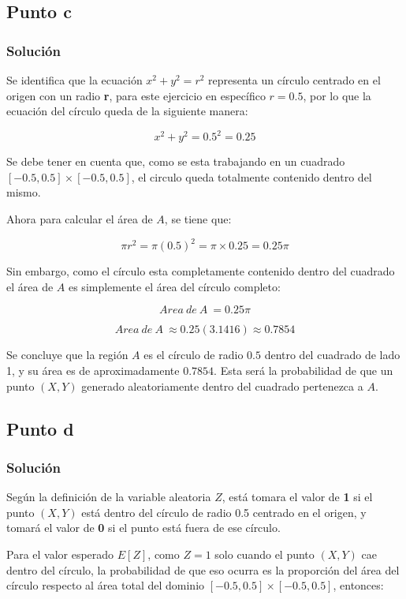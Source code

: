 \documentclass[12pt]{article}
\begin{document}
\subsection{Punto c}
\subsubsection{Solución}

Se identifica que la ecuación $x^2+y^2=r^2$ representa un círculo centrado en el origen con un radio \textbf{r}, para este ejercicio en específico $r=0.5$, por lo que la ecuación del círculo queda de la siguiente manera:

\[x^2+y^2=0.5^2=0.25\]

Se debe tener en cuenta que, como se esta trabajando en un cuadrado $[-0.5,0.5] \times [-0.5,0.5]$, el circulo queda totalmente contenido dentro del mismo.


Ahora para calcular el área de $A$, se tiene que:

\[\pi r^2=\pi(0.5)^2=\pi\times0.25=0.25\pi\]

Sin embargo, como el círculo esta completamente contenido dentro del cuadrado el área de $A$ es simplemente el área del círculo completo:

\[Area\ de\ A\ =0.25\pi\]

\[Area\ de\ A\ \approx0.25(3.1416)\approx0.7854\]

Se concluye que la región $A$ es el círculo de radio $0.5$ dentro del cuadrado de lado 1, y su área es de aproximadamente $0.7854$. Esta será la probabilidad de que un punto \textit{$(X,Y)$} generado aleatoriamente dentro del cuadrado pertenezca a $A$.


\subsection{Punto d}
\subsubsection{Solución}

Según la definición de la variable aleatoria $Z$, está tomara el valor de \textbf{1} si el punto $(X,Y)$ está dentro del círculo de radio 0.5 centrado en el origen, y tomará el valor de \textbf{0} si el punto está fuera de ese círculo. 


Para el valor esperado $E[Z]$, como $Z=1$ solo cuando el punto $(X,Y)$ cae dentro del círculo, la probabilidad de que eso ocurra es la proporción del área del círculo respecto al área total del dominio $[-0.5,0.5]\times[-0.5,0.5]$, entonces:
\end{document}
